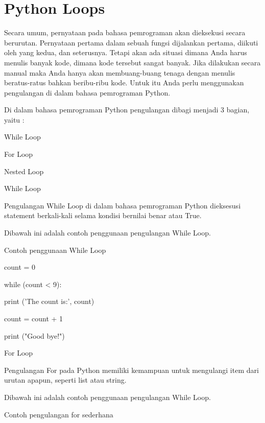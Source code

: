 
\section {Python Loops}


Secara umum, pernyataan pada bahasa pemrograman akan dieksekusi secara berurutan. Pernyataan pertama dalam sebuah fungsi dijalankan pertama, diikuti oleh yang kedua, dan seterusnya. Tetapi akan ada situasi dimana Anda harus menulis banyak kode, dimana kode tersebut sangat banyak. Jika dilakukan secara manual maka Anda hanya akan membuang-buang tenaga dengan menulis beratus-ratus bahkan beribu-ribu kode. Untuk itu Anda perlu menggunakan pengulangan di dalam bahasa pemrograman Python. 
 


Di dalam bahasa pemrograman Python pengulangan dibagi menjadi 3 bagian, yaitu : 
 
While Loop 
 
For Loop 
 
Nested Loop 
 



 
While Loop 
 
Pengulangan While Loop di dalam bahasa pemrograman Python dieksesusi statement berkali-kali selama kondisi bernilai benar atau True. 
 


Dibawah ini adalah contoh penggunaan pengulangan While Loop. 
 


 
Contoh penggunaan While Loop 
 


count = 0 
 

while (count < 9): 
 

        print ('The count is:', count) 
 

        count = count + 1 
 


print ("Good bye!") 
 




 
For Loop 
 
Pengulangan For pada Python memiliki kemampuan untuk mengulangi item dari urutan apapun, seperti   list atau string. 
 
 

Dibawah ini adalah contoh penggunaan pengulangan While Loop. 
 


 
Contoh pengulangan for sederhana 
 

